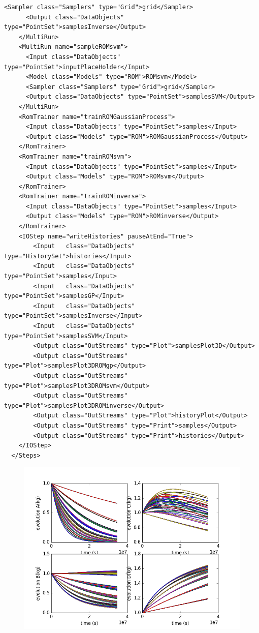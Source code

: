 \begin{enumerate}
\begin{lstlisting}[style=XML,morekeywords={arg,extension,pauseAtEnd,overwrite}]
      <Sampler class="Samplers" type="Grid">grid</Sampler>
      <Output class="DataObjects" type="PointSet">samplesInverse</Output>
    </MultiRun>
    <MultiRun name="sampleROMsvm">
      <Input class="DataObjects" type="PointSet">inputPlaceHolder</Input>
      <Model class="Models" type="ROM">ROMsvm</Model>
      <Sampler class="Samplers" type="Grid">grid</Sampler>
      <Output class="DataObjects" type="PointSet">samplesSVM</Output>
    </MultiRun>
    <RomTrainer name="trainROMGaussianProcess">
      <Input class="DataObjects" type="PointSet">samples</Input>
      <Output class="Models" type="ROM">ROMGaussianProcess</Output>
    </RomTrainer>
    <RomTrainer name="trainROMsvm">
      <Input class="DataObjects" type="PointSet">samples</Input>
      <Output class="Models" type="ROM">ROMsvm</Output>
    </RomTrainer>
    <RomTrainer name="trainROMinverse">
      <Input class="DataObjects" type="PointSet">samples</Input>
      <Output class="Models" type="ROM">ROMinverse</Output>
    </RomTrainer>
    <IOStep name="writeHistories" pauseAtEnd="True">
        <Input   class="DataObjects"      type="HistorySet">histories</Input>
        <Input   class="DataObjects"      type="PointSet">samples</Input>
        <Input   class="DataObjects"      type="PointSet">samplesGP</Input>
        <Input   class="DataObjects"      type="PointSet">samplesInverse</Input>
        <Input   class="DataObjects"      type="PointSet">samplesSVM</Input>
        <Output class="OutStreams" type="Plot">samplesPlot3D</Output>
        <Output class="OutStreams" type="Plot">samplesPlot3DROMgp</Output>
        <Output class="OutStreams" type="Plot">samplesPlot3DROMsvm</Output>
        <Output class="OutStreams" type="Plot">samplesPlot3DROMinverse</Output>
        <Output class="OutStreams" type="Plot">historyPlot</Output>
        <Output class="OutStreams" type="Print">samples</Output>
        <Output class="OutStreams" type="Print">histories</Output>
    </IOStep>
  </Steps>
\end{lstlisting}
 \begin{figure}[h!]
  \centering
  \includegraphics[scale=0.7]{pics/reducedOrderModelingHistoriesPhysicalModel.png}

\end{figure}
\end{enumerate}
